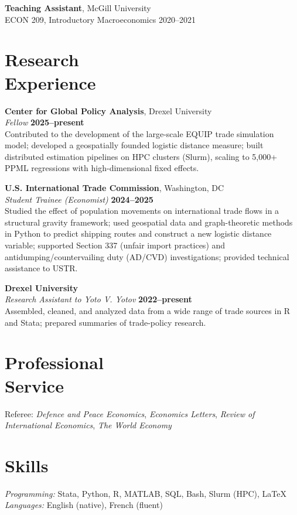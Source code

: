 \documentclass[margin,line]{res}
\newcommand{\entrygap}{\vspace{.09in}}
\newcommand{\role}[2]{{\em #1} \hfill {\bf #2}\\}
\begin{document}
\begin{resume}
\entrygap
{\bf Teaching Assistant}, McGill University\\
ECON 209, Introductory Macroeconomics \hfill 2020--2021

\section{\sc Research\\ Experience}
{\bf Center for Global Policy Analysis}, Drexel University\\
\role{Fellow}{2025--present}
Contributed to the development of the large-scale EQUIP trade simulation model; developed a geospatially founded logistic distance measure; built distributed estimation pipelines on HPC clusters (Slurm), scaling to 5,000+ PPML regressions with high-dimensional fixed effects.

\entrygap
{}
{\bf U.S. International Trade Commission}, Washington, DC\\
\role{Student Trainee (Economist)}{2024--2025}
Studied the effect of population movements on international trade flows in a structural gravity framework; used geospatial data and graph-theoretic methods in Python to predict shipping routes and construct a new logistic distance variable; supported Section 337 (unfair import practices) and antidumping/countervailing duty (AD/CVD) investigations; provided technical assistance to USTR.

\entrygap
{}
{\bf Drexel University}\\
\role{Research Assistant to Yoto V. Yotov}{2022--present}
Assembled, cleaned, and analyzed data from a wide range of trade sources in R and Stata; prepared summaries of trade-policy research.

\section{\sc Professional\\ Service}
Referee: {\em Defence and Peace Economics}, {\em Economics Letters}, {\em Review of International Economics}, {\em The World Economy}

\section{\sc Skills}
{\it Programming:} Stata, Python, R, MATLAB, SQL, Bash, Slurm (HPC), \LaTeX\\
{\it Languages:} English (native), French (fluent)


\end{resume}
\end{document}
